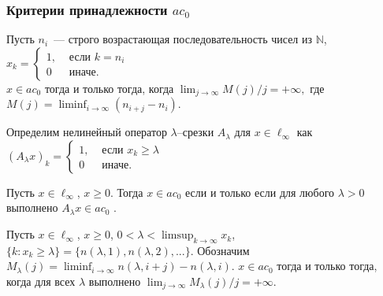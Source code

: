 \begin{varwidth}[v]{0.455\linewidth}
	\frametitle{Критерии принадлежности $ac_0$~\cite{avdeev2019space}}


	\begin{lemma}
		Пусть $n_i$~--- строго возрастающая последовательность чисел из $\mathbb{N}$,
		$\displaystyle
			x_k = \left\{\begin{array}{ll}
				1, & \mbox{~если~} k = n_i
				\\
				0  & \mbox{~иначе.~}
			\end{array}\right.
		$
		\\
		$x\in ac_0$
		тогда и только тогда, когда
		$\displaystyle
			\lim_{j \to \infty} {M(j)}/{j} = +\infty
			,
		$
		где
		$\displaystyle
			M(j) = \liminf_{i\to\infty} (n_{i+j} - n_i)
			.
		$
	\end{lemma}


	\vspace{1.1em}
	Определим нелинейный оператор $\lambda$--срезки $A_\lambda$
	для $x\in\ell_\infty$ как
	$\displaystyle
		(A_\lambda x)_k = \begin{cases}
			1, & \mbox{~если~} x_k \geq \lambda
			\\
			0  & \mbox{~иначе.~}
		\end{cases}
	$

	\vspace{0.3em}
	\begin{theorem}
		\label{thm:lambda_prelim}
		Пусть $x\in\ell_\infty$, $x\geq 0$.
		Тогда
		$
			x\in ac_0
		$
		если и только если
		для любого $\lambda > 0$
		выполнено
		$
			A_\lambda x \in ac_0
		$
		.
	\end{theorem}
	\begin{theorem}
		Пусть $x\in\ell_\infty$, $x \geq 0$,
		$\displaystyle
			0<\lambda < \limsup_{k\to\infty} x_k
		$,
		$\{k: x_k \geq \lambda \} = \{n(\lambda,1),n(\lambda,2),...\}$.
		Обозначим
		$\displaystyle
			M_{\lambda}(j) = \liminf_{i\to\infty} n(\lambda,i+j) - n(\lambda,i)
			.
		$
		$x\in ac_0$ тогда и только тогда, когда
		для всех $\lambda$ выполнено
		$\displaystyle
			\lim_{j \to \infty} {M_{\lambda}(j)}/{j} = +\infty
			.
		$
	\end{theorem}
\end{varwidth}
